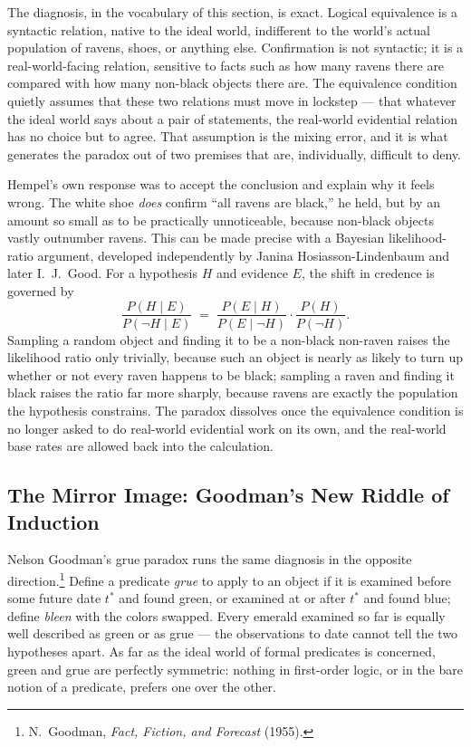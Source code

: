The diagnosis, in the vocabulary of this section, is exact. Logical equivalence
is a syntactic relation, native to the ideal world, indifferent to the world's
actual population of ravens, shoes, or anything else. Confirmation is not
syntactic; it is a real-world-facing relation, sensitive to facts such as how
many ravens there are compared with how many non-black objects there are. The
equivalence condition quietly assumes that these two relations must move in
lockstep --- that whatever the ideal world says about a pair of statements, the
real-world evidential relation has no choice but to agree. That assumption is
the mixing error, and it is what generates the paradox out of two premises that
are, individually, difficult to deny.

Hempel's own response was to accept the conclusion and explain why it feels
wrong. The white shoe \emph{does} confirm ``all ravens are
black,'' he held, but by an amount so small as to be practically unnoticeable,
because non-black objects vastly outnumber ravens. This can be made precise
with a Bayesian likelihood-ratio argument, developed independently by Janina
Hosiasson-Lindenbaum and later I.\ J.\ Good.
For a hypothesis $H$ and evidence $E$, the shift in
credence is governed by
\[
\frac{P(H \mid E)}{P(\neg H \mid E)} \;=\; 
\frac{P(E \mid H)}{P(E \mid \neg H)} \cdot \frac{P(H)}{P(\neg H)}.
\]
Sampling a random object and finding it to be a non-black non-raven raises the
likelihood ratio only trivially, because such an object is nearly as likely to
turn up whether or not every raven happens to be black; sampling a raven and
finding it black raises the ratio far more sharply, because ravens are exactly
the population the hypothesis constrains. The paradox dissolves once the
equivalence condition is no longer asked to do real-world evidential work on
its own, and the real-world base rates are allowed back into the calculation.

\subsection{The Mirror Image: Goodman's New Riddle of Induction}

Nelson Goodman's grue paradox runs the same diagnosis in the opposite
direction.\footnote{N.\ Goodman, \emph{Fact, Fiction, and Forecast} (1955).}
Define a predicate \emph{grue} to apply to an object if it is examined before
some future date $t^\ast$ and found green, or examined at or after $t^\ast$ and
found blue; define \emph{bleen} with the colors swapped. Every emerald examined
so far is equally well described as green or as grue --- the observations to
date cannot tell the two hypotheses apart. As far as the ideal world of formal
predicates is concerned, green and grue are perfectly symmetric: nothing in
first-order logic, or in the bare notion of a predicate, prefers one over the
other.

